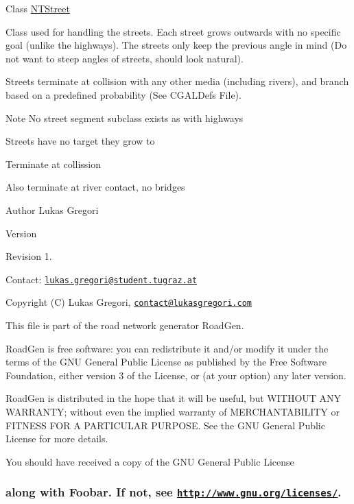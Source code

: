Class \hyperlink{class_n_t_street}{N\+T\+Street}

Class used for handling the streets. Each street grows outwards with no specific goal (unlike the highways). The streets only keep the previous angle in mind (Do not want to steep angles of streets, should look natural).

Streets terminate at collision with any other media (including rivers), and branch based on a predefined probability (See C\+G\+A\+L\+Defs File).

\begin{DoxyNote}{Note}
No street segment subclass exists as with highways 

Streets have no target they grow to 

Terminate at collission 

Also terminate at river contact, no bridges
\end{DoxyNote}
\begin{DoxyAuthor}{Author}
Lukas Gregori 
\end{DoxyAuthor}
\begin{DoxyVersion}{Version}

\end{DoxyVersion}
\begin{DoxyParagraph}{Revision}
1. 
\end{DoxyParagraph}


Contact\+: \href{mailto:lukas.gregori@student.tugraz.at}{\tt lukas.\+gregori@student.\+tugraz.\+at}



 Copyright (C) Lukas Gregori, \href{mailto:contact@lukasgregori.com}{\tt contact@lukasgregori.\+com}

This file is part of the road network generator Road\+Gen.

Road\+Gen is free software\+: you can redistribute it and/or modify it under the terms of the G\+NU General Public License as published by the Free Software Foundation, either version 3 of the License, or (at your option) any later version.

Road\+Gen is distributed in the hope that it will be useful, but W\+I\+T\+H\+O\+UT A\+NY W\+A\+R\+R\+A\+N\+TY; without even the implied warranty of M\+E\+R\+C\+H\+A\+N\+T\+A\+B\+I\+L\+I\+TY or F\+I\+T\+N\+E\+SS F\+OR A P\+A\+R\+T\+I\+C\+U\+L\+AR P\+U\+R\+P\+O\+SE. See the G\+NU General Public License for more details.

You should have received a copy of the G\+NU General Public License \subsubsection*{along with Foobar. If not, see \href{http://www.gnu.org/licenses/}{\tt http\+://www.\+gnu.\+org/licenses/}. }

